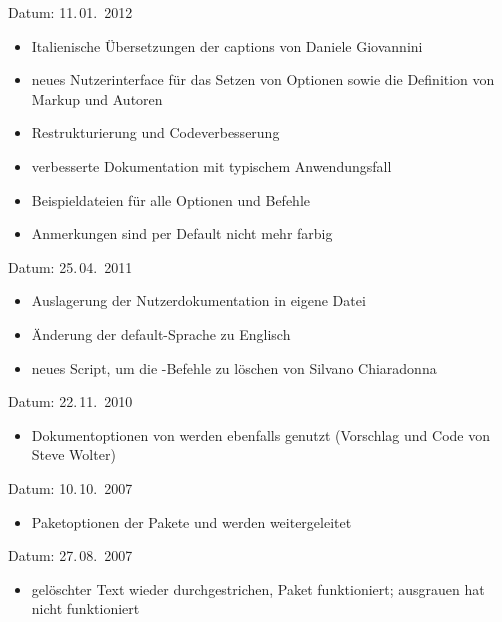 
Datum: 11.\,01.~2012
\begin{itemize}
	\item Italienische Übersetzungen der captions von Daniele Giovannini
	\item neues Nutzerinterface für das Setzen von Optionen sowie die Definition von Markup und Autoren
	\item Restrukturierung und Codeverbesserung
	\item verbesserte Dokumentation mit typischem Anwendungsfall
	\item Beispieldateien für alle Optionen und Befehle
	\item Anmerkungen sind per Default nicht mehr farbig
\end{itemize}


Datum: 25.\,04.~2011
\begin{itemize}
	\item Auslagerung der Nutzerdokumentation in eigene Datei
	\item Änderung der default-Sprache zu Englisch
	\item neues Script, um die -Befehle zu löschen von Silvano Chiaradonna
\end{itemize}


Datum: 22.\,11.~2010
\begin{itemize}
\item Dokumentoptionen von  werden ebenfalls genutzt (Vorschlag und Code von Steve Wolter)
\end{itemize}


Datum: 10.\,10.~2007
\begin{itemize}
	\item Paketoptionen der Pakete  und  werden weitergeleitet
\end{itemize}


Datum: 27.\,08.~2007
\begin{itemize}
	\item gelöschter Text wieder durchgestrichen, Paket  funktioniert; ausgrauen hat nicht funktioniert
\end{itemize}


